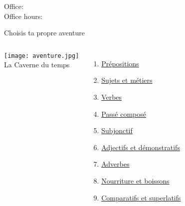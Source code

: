 \documentclass{beamer}
\subtitle[Révision: Examen 2]{Révision de l'examen 2}
\begin{document}
  \begin{frame}
    \titlepage
    \tiny{Office: \\
          Office hours: }
  \end{frame}

  \begin{frame}{Choisis ta propre aventure \\ }
    \hypertarget{début}{}
    \begin{columns}
        \begin{center}
          \texttt{[image: aventure.jpg]} \\
          La Caverne du temps
        \end{center}
        \begin{enumerate}
          \item \hyperlink{prépositions}{Prépositions}
          \item \hyperlink{sujets}{Sujets et métiers}
          \item \hyperlink{verbes}{Verbes}
          \item \hyperlink{mort}{Passé composé}
          \item \hyperlink{mort}{Subjonctif}
          \item \hyperlink{adjectifs}{Adjectifs et démonstratifs}
          \item \hyperlink{adverbes}{Adverbes}
          \item \hyperlink{mort}{Nourriture et boissons}
          \item \hyperlink{comparatifs}{Comparatifs et superlatifs}
        \end{enumerate}
    \end{columns}
  \end{frame}

\end{document}
